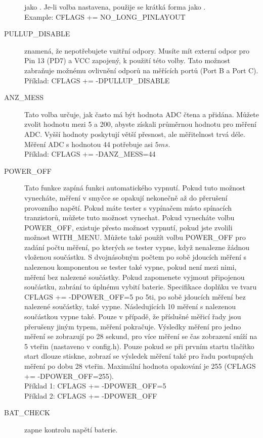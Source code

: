 \begin{description}
jako .
Je-li volba nastavena, použije se krátká forma jako .\\
Example: CFLAGS += NO\_LONG\_PINLAYOUT
  \item[PULLUP\_DISABLE] znamená, že nepotřebujete vnitřní  odpory.
Musíte mít externí  odpor pro Pin 13 (PD7) a VCC zapojený, k použití této volby.
Tato možnost zabraňuje možnému ovlivnění  odporů na měřících portů (Port B a Port C).\\
Příklad: CFLAGS += -DPULLUP\_DISABLE
  \item[ANZ\_MESS] Tato volba určuje, jak často má být hodnota ADC čtena a přidána.
Můžete zvolit hodnotu mezi 5 a 200, abyste získali průměrnou hodnotu pro měření ADC.
Vyšší hodnoty poskytují větší přesnost, ale měřitelnost trvá déle.
Měření ADC s hodnotou 44 potřebuje asi \(5ms\).\\
Příklad: CFLAGS += -DANZ\_MESS=44
  \item[POWER\_OFF] Tato funkce zapíná funkci automatického vypnutí.
Pokud tuto možnost vynecháte, měření v smyčce se opakují nekonečně až do přerušení provozního napětí.
Pokud máte tester s vypínačem místo spínacích tranzistorů, můžete tuto možnost vynechat.
Pokud vynecháte volbu POWER\_OFF, existuje přesto možnost vypnutí, pokud jste zvolili možnost WITH\_MENU.
Můžete také použít volbu POWER\_OFF pro zadání počtu měření, po kterých se tester vypne,
když nenalezne žádnou vloženou součástku.
S dvojnásobným počtem po sobě jdoucích měření s nalezenou komponentou se tester také vypne,
pokud není mezi nimi, měření bez nalezené součástky.
Pokud zapomenete vyjmout připojenou součástku, zabrání to úplnému vybití baterie.
Specifikace doplňku ve tvaru  CFLAGS += -DPOWER\_OFF=5 po 5ti, po sobě jdoucích měření bez
nalezené součástky, také vypne.
Následujících 10 měření s nalezenou součástkou vypne také.
Pouze v případě, že příslušné měřicí řady jsou přerušeny jiným typem, měření pokračuje.
Výsledky měření pro jedno měření se zobrazují po 28 sekund, pro více měření se
čas zobrazení sníží na 5 vteřin (nastaveno v config.h).
Pouze pokud se při prvním startu tlačítko start dlouze stiskne, zobrazí se výsledek měření
také pro řadu postupných měření po dobu 28 vteřin.
Maximální hodnota opakování je 255 (CFLAGS += -DPOWER\_OFF=255).\\
Příklad 1: CFLAGS += -DPOWER\_OFF=5 \\
Příklad 2: CFLAGS += -DPOWER\_OFF 
  \item[BAT\_CHECK] zapne kontrolu napětí baterie.

\end{description}
